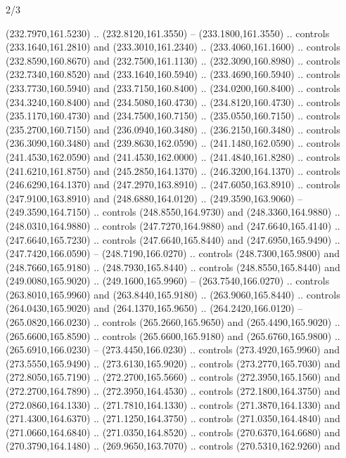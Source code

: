 \begin{flagdescription}{2/3}
\begin{scope}[xshift=0.5\flaglength,yshift=0.5\flagwidth,scale=\flagwidth/259.2]
\begin{scope}[y=0.8pt, x=0.8pt, yscale=-1,shift={(-243,-162)}]
      (232.7970,161.5230) .. (232.8120,161.3550) -- (233.1800,161.3550) .. controls
      (233.1640,161.2810) and (233.3010,161.2340) .. (233.4060,161.1600) .. controls
      (232.8590,160.8670) and (232.7500,161.1130) .. (232.3090,160.8980) .. controls
      (232.7340,160.8520) and (233.1640,160.5940) .. (233.4690,160.5940) .. controls
      (233.7730,160.5940) and (233.7150,160.8400) .. (234.0200,160.8400) .. controls
      (234.3240,160.8400) and (234.5080,160.4730) .. (234.8120,160.4730) .. controls
      (235.1170,160.4730) and (234.7500,160.7150) .. (235.0550,160.7150) .. controls
      (235.2700,160.7150) and (236.0940,160.3480) .. (236.2150,160.3480) .. controls
      (236.3090,160.3480) and (239.8630,162.0590) .. (241.1480,162.0590) .. controls
      (241.4530,162.0590) and (241.4530,162.0000) .. (241.4840,161.8280) .. controls
      (241.6210,161.8750) and (245.2850,164.1370) .. (246.3200,164.1370) .. controls
      (246.6290,164.1370) and (247.2970,163.8910) .. (247.6050,163.8910) .. controls
      (247.9100,163.8910) and (248.6880,164.0120) .. (249.3590,163.9060) --
      (249.3590,164.7150) .. controls (248.8550,164.9730) and (248.3360,164.9880) ..
      (248.0310,164.9880) .. controls (247.7270,164.9880) and (247.6640,165.4140) ..
      (247.6640,165.7230) .. controls (247.6640,165.8440) and (247.6950,165.9490) ..
      (247.7420,166.0590) -- (248.7190,166.0270) .. controls (248.7300,165.9800) and
      (248.7660,165.9180) .. (248.7930,165.8440) .. controls (248.8550,165.8440) and
      (249.0080,165.9020) .. (249.1600,165.9960) -- (263.7540,166.0270) .. controls
      (263.8010,165.9960) and (263.8440,165.9180) .. (263.9060,165.8440) .. controls
      (264.0430,165.9020) and (264.1370,165.9650) .. (264.2420,166.0120) --
      (265.0820,166.0230) .. controls (265.2660,165.9650) and (265.4490,165.9020) ..
      (265.6600,165.8590) .. controls (265.6600,165.9180) and (265.6760,165.9800) ..
      (265.6910,166.0230) -- (273.4450,166.0230) .. controls (273.4920,165.9960) and
      (273.5550,165.9490) .. (273.6130,165.9020) .. controls (273.2770,165.7030) and
      (272.8050,165.7190) .. (272.2700,165.5660) .. controls (272.3950,165.1560) and
      (272.2700,164.7890) .. (272.3950,164.4530) .. controls (272.1800,164.3750) and
      (272.0860,164.1330) .. (271.7810,164.1330) .. controls (271.3870,164.1330) and
      (271.4300,164.6370) .. (271.1250,164.3750) .. controls (271.0350,164.4840) and
      (271.0660,164.6840) .. (271.0350,164.8520) .. controls (270.6370,164.6680) and
      (270.3790,164.1480) .. (269.9650,163.7070) .. controls (270.5310,162.9260) and

\end{scope}
\end{scope}
\end{flagdescription}
